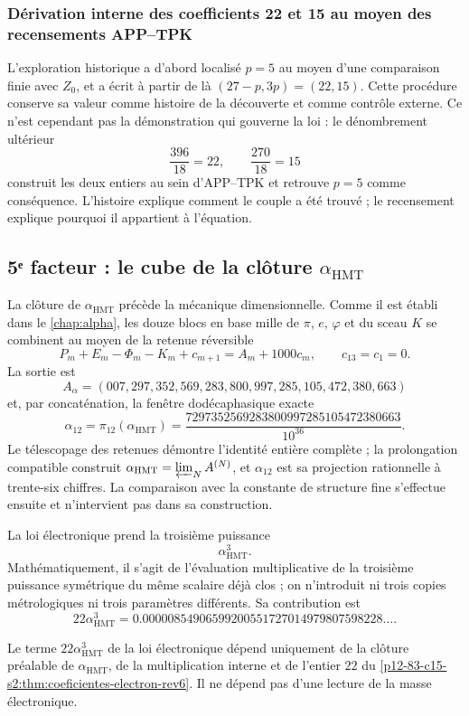 \subsubsection{Dérivation interne des coefficients 22 et 15 au moyen des recensements APP--TPK}

L'exploration historique a d'abord localisé \(p=5\) au moyen d'une comparaison
finie avec \(Z_0\), et a écrit à partir de là
\((27-p,3p)=(22,15)\). Cette procédure conserve sa valeur comme histoire de la
découverte et comme contrôle externe. Ce n'est cependant pas la démonstration
qui gouverne la loi : le dénombrement ultérieur
\[
 \frac{396}{18}=22,
 \qquad
 \frac{270}{18}=15
\]
construit les deux entiers au sein d'APP--TPK et retrouve \(p=5\) comme
conséquence. L'histoire explique comment le couple a été trouvé ; le recensement
explique pourquoi il appartient à l'équation.

\subsection{5ᵉ facteur : le cube de la clôture \(\alpha_{\mathrm{HMT}}\)}

La clôture de \(\alpha_{\mathrm{HMT}}\) précède la mécanique dimensionnelle.
Comme il est établi dans le \cref{chap:alpha}, les douze blocs en base mille
de \(\pi\), \(e\), \(\varphi\) et du sceau \(K\) se combinent au moyen de la
retenue réversible
\[
 P_m+E_m-\Phi_m-K_m+c_{m+1}
 =A_m+1000c_m,
 \qquad c_{13}=c_1=0.
\]
La sortie est
\[
 A_\alpha=
 (007,297,352,569,283,800,997,285,105,472,380,663)
\]
et, par concaténation, la fenêtre dodécaphasique exacte
\[
 \alpha_{12}=\pi_{12}(\alpha_{\mathrm{HMT}})
 =
 \frac{
 7297352569283800997285105472380663
 }{10^{36}}.
\]
Le télescopage des retenues démontre l'identité entière complète ; la
prolongation compatible construit
\(\alpha_{\mathrm{HMT}}=\varprojlim_N A^{(N)}\), et \(\alpha_{12}\) est sa
projection rationnelle à trente-six chiffres. La
comparaison avec la constante de structure fine s'effectue ensuite et
n'intervient pas dans sa construction.

La loi électronique prend la troisième puissance
\[
 \alpha_{\mathrm{HMT}}^3.
\]
Mathématiquement, il s'agit de l'évaluation multiplicative de la troisième
puissance symétrique du même scalaire déjà clos ; on n'introduit ni trois
copies métrologiques ni trois paramètres différents. Sa contribution est
\[
 22\alpha_{\mathrm{HMT}}^3
 =
 0.00000854906599200551727014979807598228\ldots.
\]

\begin{proposition}
\label{p12-83-c15-s2:prop:alpha-cubica-electron-rev6}
Le terme \(22\alpha_{\mathrm{HMT}}^3\) de la loi électronique dépend
uniquement de la clôture préalable de \(\alpha_{\mathrm{HMT}}\), de la
multiplication interne et de l'entier \(22\) du
\cref{p12-83-c15-s2:thm:coeficientes-electron-rev6}. Il ne dépend pas d'une lecture de la
masse électronique.
\end{proposition}

